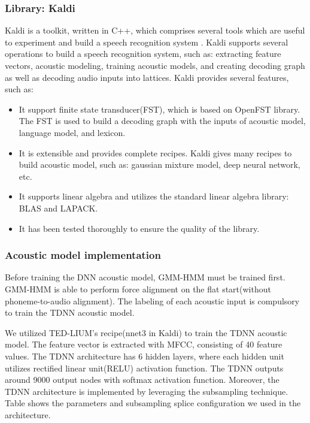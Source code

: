 \subsubsection{Library: Kaldi}
Kaldi is a toolkit, written in C++, which comprises several tools which are useful to experiment and build a speech recognition system \cite{PoveyASRU2011}. Kaldi supports several operations to build a speech recognition system, such as: extracting feature vectors, acoustic modeling, training acoustic models, and creating decoding graph as well as decoding audio inputs into lattices. Kaldi provides several features, such as:
\begin{itemize}
\item It support finite state transducer(FST), which is based on OpenFST library. The FST is used to build a decoding graph with the inputs of acoustic model, language model, and lexicon.
\item It is extensible and provides complete recipes. Kaldi gives many recipes to build acoustic model, such as: gaussian mixture model, deep neural network, etc.
\item It supports linear algebra and utilizes the standard linear algebra library: BLAS and LAPACK.
\item It has been tested thoroughly to ensure the quality of the library.
\end{itemize}

\subsubsection{Acoustic model implementation}
Before training the DNN acoustic model, GMM-HMM must be trained first. GMM-HMM is able to perform force alignment on the flat start(without phoneme-to-audio alignment). The labeling of each acoustic input is compulsory to train the TDNN acoustic model. 

We utilized TED-LIUM's recipe(nnet3 in Kaldi) to train the TDNN acoustic model. The feature vector is extracted with MFCC, consisting of 40 feature values. The TDNN architecture has 6 hidden layers, where each hidden unit  utilizes rectified linear unit(RELU) activation function. The TDNN outputs around 9000 output nodes with softmax activation function. Moreover, the TDNN architecture is implemented by leveraging the subsampling technique. Table shows the parameters and subsampling splice configuration we used in the architecture.

